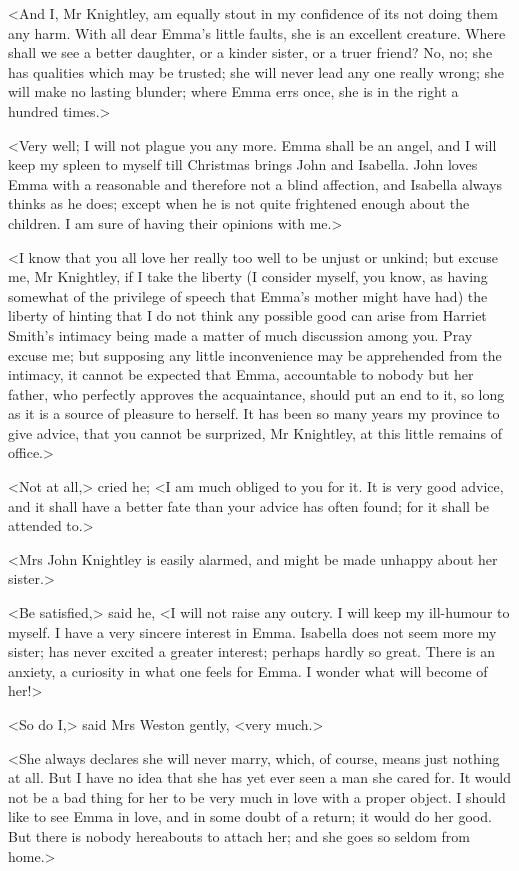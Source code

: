 <And I, Mr Knightley, am equally stout in my confidence of its not doing them any harm. With all dear Emma's little faults, she is an excellent creature. Where shall we see a better daughter, or a kinder sister, or a truer friend? No, no; she has qualities which may be trusted; she will never lead any one really wrong; she will make no lasting blunder; where Emma errs once, she is in the right a hundred times.>

<Very well; I will not plague you any more. Emma shall be an angel, and I will keep my spleen to myself till Christmas brings John and Isabella. John loves Emma with a reasonable and therefore not a blind affection, and Isabella always thinks as he does; except when he is not quite frightened enough about the children. I am sure of having their opinions with me.>

<I know that you all love her really too well to be unjust or unkind; but excuse me, Mr Knightley, if I take the liberty (I consider myself, you know, as having somewhat of the privilege of speech that Emma's mother might have had) the liberty of hinting that I do not think any possible good can arise from Harriet Smith's intimacy being made a matter of much discussion among you. Pray excuse me; but supposing any little inconvenience may be apprehended from the intimacy, it cannot be expected that Emma, accountable to nobody but her father, who perfectly approves the acquaintance, should put an end to it, so long as it is a source of pleasure to herself. It has been so many years my province to give advice, that you cannot be surprized, Mr Knightley, at this little remains of office.>

<Not at all,> cried he; <I am much obliged to you for it. It is very good advice, and it shall have a better fate than your advice has often found; for it shall be attended to.>

<Mrs John Knightley is easily alarmed, and might be made unhappy about her sister.>

<Be satisfied,> said he, <I will not raise any outcry. I will keep my ill-humour to myself. I have a very sincere interest in Emma. Isabella does not seem more my sister; has never excited a greater interest; perhaps hardly so great. There is an anxiety, a curiosity in what one feels for Emma. I wonder what will become of her!>

<So do I,> said Mrs Weston gently, <very much.>

<She always declares she will never marry, which, of course, means just nothing at all. But I have no idea that she has yet ever seen a man she cared for. It would not be a bad thing for her to be very much in love with a proper object. I should like to see Emma in love, and in some doubt of a return; it would do her good. But there is nobody hereabouts to attach her; and she goes so seldom from home.>

